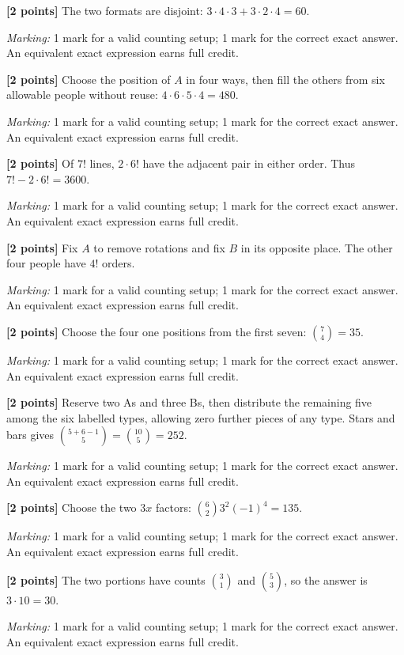 \documentclass[12pt,letterpaper]{article}
\begin{document}
\begin{description}[font=\normalfont,leftmargin=1.2em,labelsep=0.4em]
\item[(a)] \textbf{[2 points]} The two formats are disjoint: $3\cdot4\cdot3+3\cdot2\cdot4=60$.
\par\textit{Marking:} 1 mark for a valid counting setup; 1 mark for the correct exact answer. An equivalent exact expression earns full credit.
\item[(b)] \textbf{[2 points]} Choose the position of $A$ in four ways, then fill the others from six allowable people without reuse: $4\cdot6\cdot5\cdot4=480$.
\par\textit{Marking:} 1 mark for a valid counting setup; 1 mark for the correct exact answer. An equivalent exact expression earns full credit.
\item[(c)] \textbf{[2 points]} Of $7!$ lines, $2\cdot6!$ have the adjacent pair in either order. Thus $7!-2\cdot6!=3600$.
\par\textit{Marking:} 1 mark for a valid counting setup; 1 mark for the correct exact answer. An equivalent exact expression earns full credit.
\item[(d)] \textbf{[2 points]} Fix $A$ to remove rotations and fix $B$ in its opposite place. The other four people have $4!$ orders.
\par\textit{Marking:} 1 mark for a valid counting setup; 1 mark for the correct exact answer. An equivalent exact expression earns full credit.
\item[(e)] \textbf{[2 points]} Choose the four one positions from the first seven: $\binom74=35$.
\par\textit{Marking:} 1 mark for a valid counting setup; 1 mark for the correct exact answer. An equivalent exact expression earns full credit.
\item[(f)] \textbf{[2 points]} Reserve two As and three Bs, then distribute the remaining five among the six labelled types, allowing zero further pieces of any type. Stars and bars gives $\binom{5+6-1}{5}=\binom{10}{5}=252$.
\par\textit{Marking:} 1 mark for a valid counting setup; 1 mark for the correct exact answer. An equivalent exact expression earns full credit.
\item[(g)] \textbf{[2 points]} Choose the two $3x$ factors: $\binom62 3^2(-1)^4=135$.
\par\textit{Marking:} 1 mark for a valid counting setup; 1 mark for the correct exact answer. An equivalent exact expression earns full credit.
\item[(h)] \textbf{[2 points]} The two portions have counts $\binom31$ and $\binom53$, so the answer is $3\cdot10=30$.
\par\textit{Marking:} 1 mark for a valid counting setup; 1 mark for the correct exact answer. An equivalent exact expression earns full credit.
\end{description}
\end{document}
